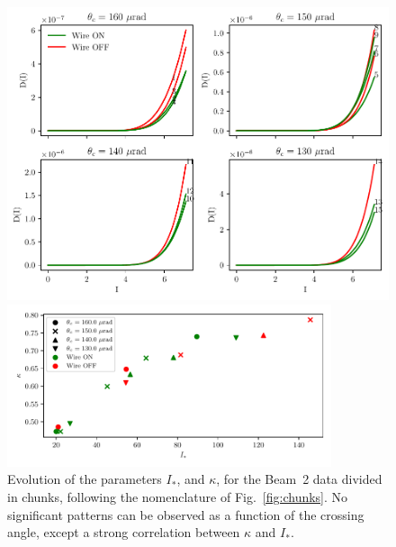 \begin{figure}[p]
    \centering
    \includegraphics[width=.85\textwidth]{5_wire_compensators_LHC/figs/fokker_planck_b2_2.pdf}
    \caption{Reconstructed $D(I)$ for the data of Beam~2 divided in chunks, following the nomenclature of Fig.~\ref{fig:chunks}. It can be seen how the reconstructed $D(I)$ is consistently different when the wires are switched on and off, with, in general higher diffusion values when the wires are off. The only exception is given by chunk 6, with a crossing angle of $\theta_c=$\SI{150}{\micro\radian}.}
    \label{fig:reconstruction_5}
    \vspace{\floatsep}
    \includegraphics[width=0.85\textwidth]{5_wire_compensators_LHC/figs/fokker_planck_b2.pdf}
    \caption{Evolution of the parameters $I_\ast$, and $\kappa$, for the Beam~2 data divided in chunks, following the nomenclature of Fig.~\ref{fig:chunks}. No significant patterns can be observed as a function of the crossing angle, except a strong correlation between $\kappa$ and $I_\ast$.}
    \label{fig:parameters_3}
\end{figure}

